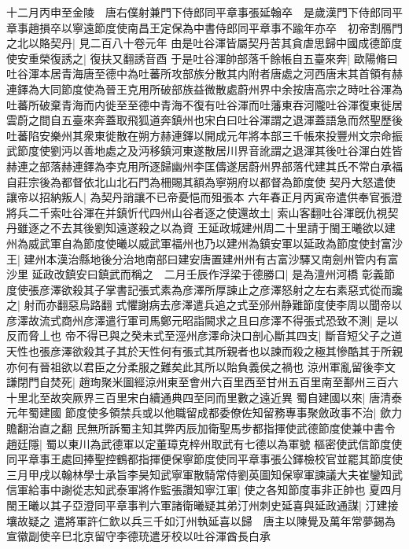 十二月丙申至金陵　唐右僕射兼門下侍郎同平章事張延翰卒　是歲漢門下侍郎同平章事趙損卒以寧遠節度使南昌王定保為中書侍郎同平章事不踰年亦卒　初帝割鴈門之北以賂契丹|{
	見二百八十卷元年}
由是吐谷渾皆屬契丹苦其貪虐思歸中國成德節度使安重榮復誘之|{
	復扶又翻誘音酉}
于是吐谷渾帥部落千餘帳自五臺來奔|{
	歐陽脩曰吐谷渾本居青海唐至德中為吐蕃所攻部族分散其内附者唐處之河西唐末其首領有赫連鐸為大同節度使為晉王克用所破部族益微散處蔚州界中余按唐高宗之時吐谷渾為吐蕃所破棄青海而内徙至至德中青海不復有吐谷渾而吐藩東吞河隴吐谷渾復東徙居雲蔚之間自五臺來奔蓋取飛狐道奔鎮州也宋白曰吐谷渾謂之退渾蓋語急而然聖歷後吐蕃陷安樂州其衆東徙散在朔方赫連鐸以開成元年將本部三千帳來投豐州文宗命振武節度使劉沔以善地處之及沔移鎮河東遂散居川界音訛謂之退渾其後吐谷渾白姓皆赫連之部落赫連鐸為李克用所逐歸幽州李匡儔遂居蔚州界部落代建其氏不常白承福自莊宗後為都督依北山北石門為柵賜其額為寧朔府以都督為節度使}
契丹大怒遣使讓帝以招納叛人|{
	為契丹誚讓不已帝憂悒而殂張本}
六年春正月丙寅帝遣供奉官張澄將兵二千索吐谷渾在并鎮忻代四州山谷者逐之使還故土|{
	索山客翻吐谷渾旣仇視契丹雖逐之不去其後劉知遠遂殺之以為資}
王延政城建州周二十里請于閩王曦欲以建州為威武軍自為節度使曦以威武軍福州也乃以建州為鎮安軍以延政為節度使封富沙王|{
	建州本漢治縣地後分治地南部曰建安唐置建州州有古富沙驛又南劍州管内有富沙里}
延政改鎮安曰鎮武而稱之　二月壬辰作浮梁于德勝口|{
	是為澶州河橋}
彰義節度使張彦澤欲殺其子掌書記張式素為彦澤所厚諫止之彦澤怒射之左右素惡式從而讒之|{
	射而亦翻惡烏路翻}
式懼謝病去彦澤遣兵追之式至邠州静難節度使李周以聞帝以彦澤故流式商州彦澤遣行軍司馬鄭元昭詣闕求之且曰彦澤不得張式恐致不測|{
	是以反而脅丄也}
帝不得已與之癸未式至涇州彦澤命決口剖心斷其四支|{
	斷音短父子之道天性也張彦澤欲殺其子其於天性何有張式其所親者也以諫而殺之極其慘酷其于所親亦何有晉祖欲以君臣之分柔服之難矣此其所以貽負義侯之禍也}
涼州軍亂留後李文謙閉門自焚死|{
	趙珣聚米圖經涼州東至會州六百里西至甘州五百里南至鄯州三百六十里北至故突厥界三百里宋白續通典四至同而里數之遠近異}
蜀自建國以來|{
	唐清泰元年蜀建國}
節度使多領禁兵或以他職留成都委僚佐知留務專事聚斂政事不治|{
	歛力贍翻治直之翻}
民無所訴蜀主知其弊丙辰加衛聖馬步都指揮使武德節度使兼中書令趙廷隱|{
	蜀以東川為武德軍以定董璋克梓州取武有七德以為軍號}
樞密使武信節度使同平章事王處回捧聖控鶴都指揮便保寧節度使同平章事張公鐸檢校官並罷其節度使三月甲戌以翰林學士承旨李昊知武寧軍散騎常侍劉英圖知保寧軍諫議大夫崔鑾知武信軍給事中謝從志知武泰軍將作監張讚知寧江軍|{
	使之各知節度事非正帥也}
夏四月閩王曦以其子亞澄同平章事判六軍諸衛曦疑其弟汀州刺史延喜與延政通謀|{
	汀建接壤故疑之}
遣將軍許仁欽以兵三千如汀州執延喜以歸　唐主以陳覺及萬年常夢錫為宣徽副使辛巳北京留守李德珫遣牙校以吐谷渾酋長白承

